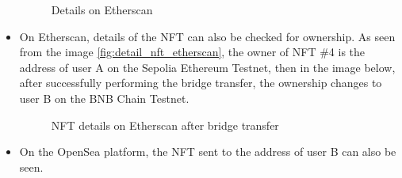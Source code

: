 \begin{itemize}
    \begin{figure} [H] \centering
    \caption{Details on Etherscan}
    \label{fig:details_etherscan}
    \end{figure}

    \item On Etherscan, details of the NFT can also be checked for ownership. As seen from the image \ref{fig:detail_nft_etherscan}, the owner of NFT \#4 is the address of user A on the Sepolia Ethereum Testnet, then in the image below, after successfully performing the bridge transfer, the ownership changes to user B on the BNB Chain Testnet.

    \begin{figure} [H] \centering
    \caption{NFT details on Etherscan after bridge transfer}
    \label{fig:nft_bridge_transfer}
    \end{figure}

    \item On the OpenSea platform, the NFT sent to the address of user B can also be seen.


\end{itemize}
